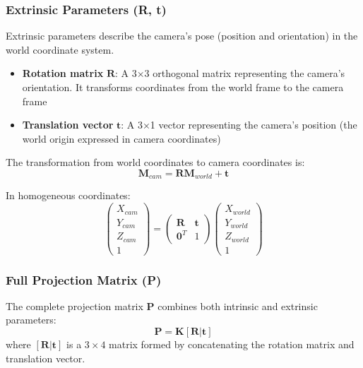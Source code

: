 \documentclass[11pt,a4paper]{article}
\theoremstyle{definition}
\theoremstyle{plain}
\theoremstyle{remark}
\begin{document}
\subsubsection{Extrinsic Parameters (R, t)}

Extrinsic parameters describe the camera's pose (position and orientation) in the world coordinate system.

\begin{itemize}
    \item \textbf{Rotation matrix} $\mathbf{R}$: A 3×3 orthogonal matrix representing the camera's orientation. It transforms coordinates from the world frame to the camera frame
    \item \textbf{Translation vector} $\mathbf{t}$: A 3×1 vector representing the camera's position (the world origin expressed in camera coordinates)
\end{itemize}

The transformation from world coordinates to camera coordinates is:
\begin{equation} \label{eq:world_to_camera}
    \mathbf{M}_{cam} = \mathbf{R} \mathbf{M}_{world} + \mathbf{t}
\end{equation}

In homogeneous coordinates:
\begin{equation} \nonumber
    \begin{pmatrix} X_{cam} \\ Y_{cam} \\ Z_{cam} \\ 1 \end{pmatrix} = \begin{pmatrix}
    \mathbf{R} & \mathbf{t} \\
    \mathbf{0}^T & 1
    \end{pmatrix} \begin{pmatrix} X_{world} \\ Y_{world} \\ Z_{world} \\ 1 \end{pmatrix}
\end{equation}

\subsubsection{Full Projection Matrix (P)}

The complete projection matrix $\mathbf{P}$ combines both intrinsic and extrinsic parameters:
\begin{equation} \label{eq:full_projection_matrix}
    \mathbf{P} = \mathbf{K} [\mathbf{R} | \mathbf{t}]
\end{equation}
where $[\mathbf{R} | \mathbf{t}]$ is a $3 \times 4$ matrix formed by concatenating the rotation matrix and translation vector.
\end{document}
